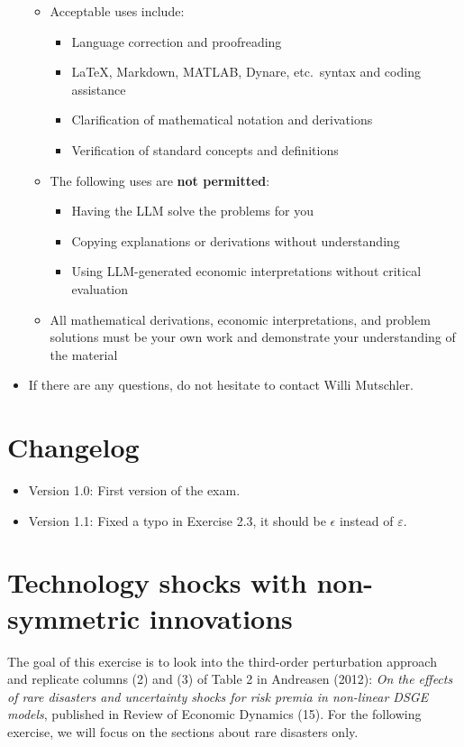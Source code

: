 \documentclass{article}
\numberwithin{equation}{section}
\begin{document}
\begin{itemize}
\begin{itemize}
    \item Acceptable uses include:
      \begin{itemize}
        \item Language correction and proofreading
        \item LaTeX, Markdown, MATLAB, Dynare, etc.\ syntax and coding assistance
        \item Clarification of mathematical notation and derivations
        \item Verification of standard concepts and definitions
      \end{itemize}
    \item The following uses are \textbf{not permitted}:
      \begin{itemize}
        \item Having the LLM solve the problems for you
        \item Copying explanations or derivations without understanding
        \item Using LLM-generated economic interpretations without critical evaluation
      \end{itemize}
    \item All mathematical derivations, economic interpretations, and problem solutions must be your own work and demonstrate your understanding of the material
    
  \end{itemize}
\item
If there are any questions, do not hesitate to contact Willi Mutschler.
\end{itemize}

\section*{Changelog}
\begin{itemize}
\item Version 1.0: First version of the exam.
\item Version 1.1: Fixed a typo in Exercise 2.3, it should be \(\epsilon \) instead of \(\varepsilon \).
\end{itemize}

\newpage

\section[Technology shocks with non-symmetric innovations]{Technology shocks with non-symmetric innovations\label{ex:Andreasen_2012}}
The goal of this exercise is to look into the third-order perturbation approach and replicate columns (2) and (3) of Table 2 in Andreasen (2012):
  \emph{On the effects of rare disasters and uncertainty shocks for risk premia in non-linear DSGE models},
  published in Review of Economic Dynamics (15).
For the following exercise, we will focus on the sections about rare disasters only.
\end{document}
